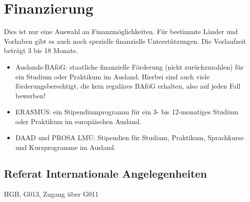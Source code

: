 \begin{urlList}
\end{urlList}

\section{Finanzierung}

Dies ist nur eine Auswahl an Finanzmöglichkeiten. Für bestimmte Länder und
Vorhaben gibt es auch noch spezielle finanzielle Unterstützungen. Die
Vorlaufzeit beträgt 3 bis 18 Monate.

\begin{itemize}
\item Auslands-BAföG: staatliche finanzielle Förderung (nicht zurückzuzahlen) für ein Studium oder Praktikum im Ausland. Hierbei sind auch viele förderungsberechtigt, die kein reguläres BAföG erhalten, also auf jeden Fall bewerben!
\item ERASMUS: ein Stipendiumprogramm für ein 3- bis 12-monatiges Studium oder Praktikum im europäischen Ausland.
\item DAAD und PROSA LMU: Stipendien für Studium, Praktikum, Sprachkurse und Kurzprogramme im Ausland.
\end{itemize}

\subsection*{Referat Internationale Angelegenheiten}
HGB, G013, Zugang über G011

\begin{urlList}
\end{urlList}
